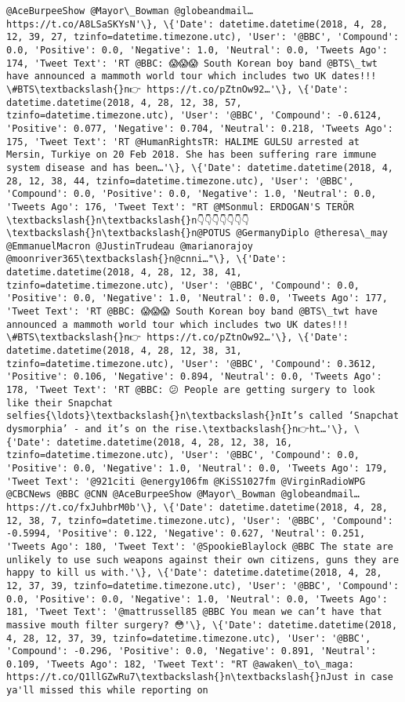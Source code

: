 \documentclass[11pt]{article}
\begin{document}
\begin{Verbatim}[commandchars=\\\{\}]
@AceBurpeeShow @Mayor\_Bowman @globeandmail… https://t.co/A8LSaSKYsN'\}, \{'Date': datetime.datetime(2018, 4, 28, 12, 39, 27, tzinfo=datetime.timezone.utc), 'User': '@BBC', 'Compound': 0.0, 'Positive': 0.0, 'Negative': 1.0, 'Neutral': 0.0, 'Tweets Ago': 174, 'Tweet Text': 'RT @BBC: 😱😱😱 South Korean boy band @BTS\_twt have announced a mammoth world tour which includes two UK dates!!! \#BTS\textbackslash{}n👉 https://t.co/pZtnOw92…'\}, \{'Date': datetime.datetime(2018, 4, 28, 12, 38, 57, tzinfo=datetime.timezone.utc), 'User': '@BBC', 'Compound': -0.6124, 'Positive': 0.077, 'Negative': 0.704, 'Neutral': 0.218, 'Tweets Ago': 175, 'Tweet Text': 'RT @HumanRightsTR: HALIME GULSU arrested at Mersin, Turkiye on 20 Feb 2018. She has been suffering rare immune system disease and has been…'\}, \{'Date': datetime.datetime(2018, 4, 28, 12, 38, 44, tzinfo=datetime.timezone.utc), 'User': '@BBC', 'Compound': 0.0, 'Positive': 0.0, 'Negative': 1.0, 'Neutral': 0.0, 'Tweets Ago': 176, 'Tweet Text': "RT @MSonmul: ERDOGAN'S TERÖR \textbackslash{}n\textbackslash{}n👇👇👇👇👇👇👇\textbackslash{}n\textbackslash{}n@POTUS @GermanyDiplo @theresa\_may @EmmanuelMacron @JustinTrudeau @marianorajoy @moonriver365\textbackslash{}n@cnni…"\}, \{'Date': datetime.datetime(2018, 4, 28, 12, 38, 41, tzinfo=datetime.timezone.utc), 'User': '@BBC', 'Compound': 0.0, 'Positive': 0.0, 'Negative': 1.0, 'Neutral': 0.0, 'Tweets Ago': 177, 'Tweet Text': 'RT @BBC: 😱😱😱 South Korean boy band @BTS\_twt have announced a mammoth world tour which includes two UK dates!!! \#BTS\textbackslash{}n👉 https://t.co/pZtnOw92…'\}, \{'Date': datetime.datetime(2018, 4, 28, 12, 38, 31, tzinfo=datetime.timezone.utc), 'User': '@BBC', 'Compound': 0.3612, 'Positive': 0.106, 'Negative': 0.894, 'Neutral': 0.0, 'Tweets Ago': 178, 'Tweet Text': 'RT @BBC: 😕 People are getting surgery to look like their Snapchat selfies{\ldots}\textbackslash{}n\textbackslash{}nIt’s called ‘Snapchat dysmorphia’ - and it’s on the rise.\textbackslash{}n👉ht…'\}, \{'Date': datetime.datetime(2018, 4, 28, 12, 38, 16, tzinfo=datetime.timezone.utc), 'User': '@BBC', 'Compound': 0.0, 'Positive': 0.0, 'Negative': 1.0, 'Neutral': 0.0, 'Tweets Ago': 179, 'Tweet Text': '@921citi @energy106fm @KiSS1027fm @VirginRadioWPG @CBCNews @BBC @CNN @AceBurpeeShow @Mayor\_Bowman @globeandmail… https://t.co/fxJuhbrM0b'\}, \{'Date': datetime.datetime(2018, 4, 28, 12, 38, 7, tzinfo=datetime.timezone.utc), 'User': '@BBC', 'Compound': -0.5994, 'Positive': 0.122, 'Negative': 0.627, 'Neutral': 0.251, 'Tweets Ago': 180, 'Tweet Text': '@SpookieBlaylock @BBC The state are unlikely to use such weapons against their own citizens, guns they are happy to kill us with.'\}, \{'Date': datetime.datetime(2018, 4, 28, 12, 37, 39, tzinfo=datetime.timezone.utc), 'User': '@BBC', 'Compound': 0.0, 'Positive': 0.0, 'Negative': 1.0, 'Neutral': 0.0, 'Tweets Ago': 181, 'Tweet Text': '@mattrussell85 @BBC You mean we can’t have that massive mouth filter surgery? 😳'\}, \{'Date': datetime.datetime(2018, 4, 28, 12, 37, 39, tzinfo=datetime.timezone.utc), 'User': '@BBC', 'Compound': -0.296, 'Positive': 0.0, 'Negative': 0.891, 'Neutral': 0.109, 'Tweets Ago': 182, 'Tweet Text': "RT @awaken\_to\_maga: https://t.co/Q1llGZwRu7\textbackslash{}n\textbackslash{}nJust in case ya'll missed this while reporting on 
\end{Verbatim}
\end{document}
